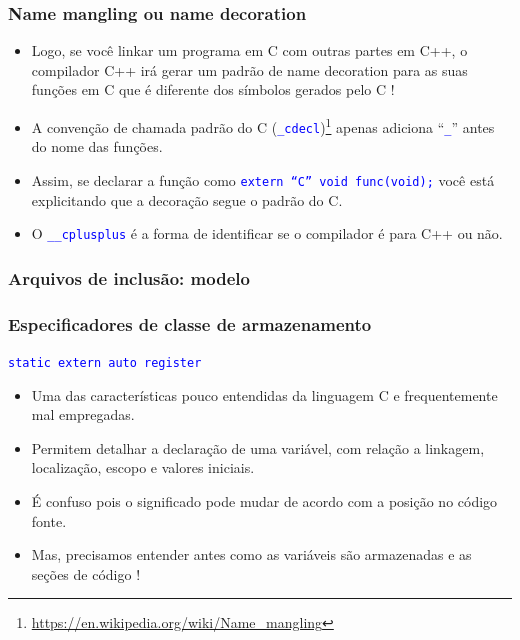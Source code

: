 \documentclass{beamer}
\begin{document}
\begin{frame}[fragile]
	\frametitle{Name mangling ou name decoration}
		\begin{itemize}
			\item Logo, se você linkar um programa em C com outras partes em C++, o compilador C++ irá gerar um padrão de name decoration para as suas funções em C que é diferente dos símbolos gerados pelo C !
           \item A convenção de chamada padrão do C (\texttt{\textcolor{blue}{\_cdecl}})\footnote{\tiny{\url{https://en.wikipedia.org/wiki/Name_mangling}}} apenas adiciona ``\texttt{\textcolor{blue}{\_}}'' antes do nome das funções.
           \item Assim, se declarar a função como \texttt{\textcolor{blue}{extern ``C'' void func(void);}} você está explicitando que a decoração segue o padrão do C.
           \item O \texttt{\textcolor{blue}{\_\_cplusplus}} é a forma de identificar se o compilador é para C++ ou não.
		\end{itemize}
\end{frame}

\begin{frame}
	\frametitle{Arquivos de inclusão: modelo}
	
\end{frame}

\begin{frame}
	\frametitle{Especificadores de classe de armazenamento}
	\begin{center}
		\texttt{\textcolor{blue}{static extern auto register}}
	\end{center}
	\begin{itemize}
		\vspace*{0.5cm}
	\item Uma das características pouco entendidas da linguagem C e frequentemente mal empregadas.
	\item Permitem detalhar a declaração de uma variável, com relação a linkagem, localização, escopo e valores iniciais.
	\item É confuso pois o significado pode mudar de acordo com a posição no código fonte.
	\item Mas, precisamos entender antes como as variáveis são armazenadas e as seções de código !
	\end{itemize}
\end{frame}
\end{document}
